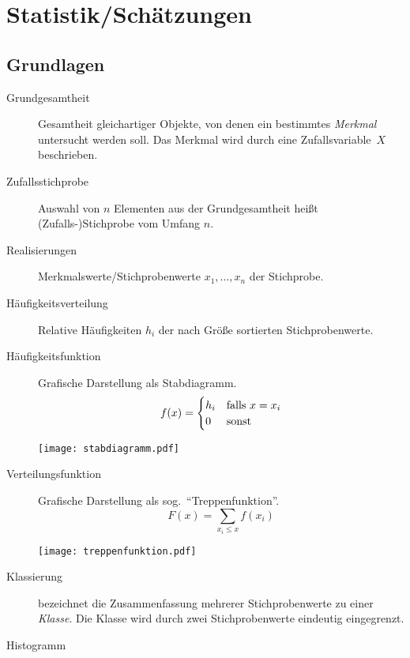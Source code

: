 \chapter{Statistik/Schätzungen}


\section{Grundlagen}
\begin{description}
  \item [{Grundgesamtheit}] 
	Gesamtheit gleichartiger Objekte, von denen ein bestimmtes \emph{Merkmal} untersucht werden soll.
	Das Merkmal wird durch eine Zufallsvariable~$X$ beschrieben.
  \item [{Zufallsstichprobe}] 
	Auswahl von $n$ Elementen aus der Grundgesamtheit heißt (Zufalls-)Stichprobe vom Umfang $n$.
  \item [{Realisierungen}] 
	Merkmalswerte/Stichprobenwerte $x_1,\ldots,x_n$ der Stichprobe.
  \item [{Häufigkeitsverteilung}] 
	Relative Häufigkeiten $h_i$ der nach Größe sortierten Stichprobenwerte.
  \item [{Häufigkeitsfunktion}] 
	Grafische Darstellung als Stabdiagramm.
	\[
	  f(x) =
	  \begin{cases}
	    h_i & \hbox{falls $x=x_i$}\\
	    0 & \hbox{sonst}
	  \end{cases}
	\]
	\begin{center}
	  \texttt{[image: stabdiagramm.pdf]}
	\end{center}
  \item [{Verteilungsfunktion}] 
	Grafische Darstellung als sog.~\enquote{Treppenfunktion}.
	\[ F(x)=\sum_{x_i \leq x}f(x_i) \]
	\begin{center}
	  \texttt{[image: treppenfunktion.pdf]}
	\end{center}
  \item [{Klassierung}] 
	bezeichnet die Zusammenfassung mehrerer Stichprobenwerte zu einer \emph{Klasse}. Die Klasse wird durch zwei Stichprobenwerte eindeutig eingegrenzt.
  \item [{Histogramm}] 

\end{description}
